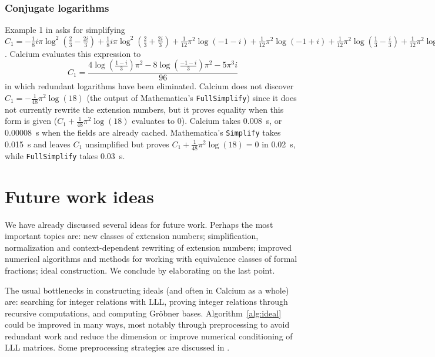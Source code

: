 \documentclass[sigconf,screen,urlbreakonhyphens]{acmart}
\begin{document}
\subsubsection{Conjugate logarithms}

Example 1 in \cite{BBK2014} asks for simplifying $C_1 = -\frac{1}{8} i \pi \log^{2}(\frac{2}{3} - \frac{2 i}{3}) + \frac{1}{8} i \pi \log^{2}(\frac{2}{3} + \frac{2 i}{3}) + \frac{1}{12} {\pi}^{2} \log(-1 - i) + \frac{1}{12} {\pi}^{2} \log(-1 + i) + \frac{1}{12} {\pi}^{2} \log(\frac{1}{3} - \frac{i}{3}) + \frac{1}{12} {\pi}^{2} \log(\frac{1}{3} + \frac{i}{3})$.
Calcium evaluates this expression to
$$C_1 = \frac{4 \log(\frac{1 - i}{3}) {\pi}^{2} - 8 \log(\frac{-1 - i}{3}) {\pi}^{2} - 5 {\pi}^{3} i}{96}$$
in which redundant logarithms have been eliminated.
Calcium does not discover $C_1 = -\tfrac{1}{48} \pi^2 \log(18)$ (the output of Mathematica's \texttt{FullSimplify})
since it does not currently rewrite the extension numbers, but
it proves equality when this form is given ($C_1 + \tfrac{1}{48} \pi^2 \log(18)$ evaluates to 0).
Calcium takes 0.008~s, or 0.00008~s when the fields are already cached.
Mathematica's \texttt{Simplify} takes 0.015~s
and leaves $C_1$ unsimplified but proves $C_1 + \tfrac{1}{48} \pi^2 \log(18) = 0$ in 0.02~s, while \texttt{FullSimplify} takes 0.03~s.

\section{Future work ideas}

We have already discussed several ideas for future work.
Perhaps the most important topics are: new classes
of extension numbers;
simplification, normalization and context-dependent
rewriting of extension numbers; improved numerical algorithms
and methods for working with equivalence classes
of formal fractions; ideal construction.
We conclude by elaborating on the last point.

The usual bottlenecks in constructing ideals (and often in Calcium
as a whole) are: searching for integer relations with LLL,
proving integer relations through recursive computations,
and computing Gr\"{o}bner bases.
Algorithm~\ref{alg:ideal} could be improved in many ways,
most notably through preprocessing
to avoid redundant work and
reduce the dimension or improve numerical
conditioning of LLL matrices.
Some preprocessing strategies are discussed in \cite{BBK2014}.
\end{document}
